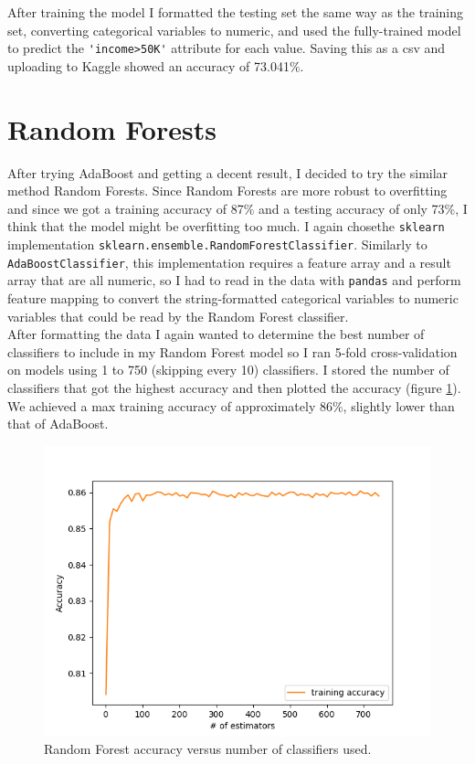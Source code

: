 \documentclass{article}
\begin{document}
        After training the model I formatted the testing set the same way as the training set, converting categorical variables to numeric, and used the fully-trained model to predict the \lstinline{'income>50K'} attribute for each value. Saving this as a csv and uploading to Kaggle showed an accuracy of 73.041\%. 

    \section{Random Forests}
        After trying AdaBoost and getting a decent result, I decided to try the similar method Random Forests. Since Random Forests are more robust to overfitting and since we got a training accuracy of 87\% and a testing accuracy of only 73\%, I think that the model might be overfitting too much. I again chosethe \lstinline{sklearn} implementation \lstinline{sklearn.ensemble.RandomForestClassifier}. Similarly to \lstinline{AdaBoostClassifier}, this implementation requires a feature array and a result array that are all numeric, so I had to read in the data with \lstinline{pandas} and perform feature mapping to convert the string-formatted categorical variables to numeric variables that could be read by the Random Forest classifier.  \\

        After formatting the data I again wanted to determine the best number of classifiers to include in my Random Forest model so I ran 5-fold cross-validation on models using 1 to 750 (skipping every 10) classifiers. I stored the number of classifiers that got the highest accuracy and then plotted the accuracy (figure \ref{fig:rf_acc}). We achieved a max training accuracy of approximately 86\%, slightly lower than that of AdaBoost. 
        \begin{figure}[H]
            \centering
            \includegraphics[width=0.5\linewidth]{./img/rf_acc.png}
            \caption{Random Forest accuracy versus number of classifiers used.}
            \label{fig:rf_acc}
        \end{figure}
\end{document}
